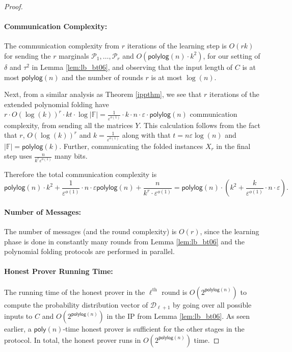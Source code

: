 \documentclass[11pt]{article}
\newcommand{\poly}{\mathsf{poly}}
\newcommand{\polylog}{\mathsf{polylog}}
\newcommand{\F}{\mathbb{F}}
\newcommand{\sD}{\mathcal{D}}
\newcommand{\sP}{\mathcal{P}}
\begin{document}
\begin{proof}
\paragraph*{Communication Complexity:}
The communication complexity from $r$ iterations of the learning step is $O(rk)$ for sending the $r$ marginals $\sP_1, \dots, \sP_r$ and $O(\polylog (n)\cdot k^{2})$, for our setting of $\delta$ and $\tau^{2}$ in Lemma \ref{lem:lb_bt06}, and observing that the input length of $C$ is at most $\polylog(n)$ and the number of rounds $r$ is at most $\log (n)$. 

Next, from a similar analysis as Theorem \ref{ippthm}, we see that $r$ iterations of the extended polynomial folding have $r\cdot O(\log (k))^{r}\cdot kt\cdot \log\vert \F \vert=\frac{1}{\varepsilon^{o(1)}}\cdot k\cdot n\cdot \varepsilon\cdot \polylog(n)$ communication complexity, from sending all the matrices $Y$. This calculation follows from the fact that $r$, $O(\log (k))^{r}$ and $k=\frac{1}{\varepsilon^{o(1)}}$ along with that $t=n\varepsilon\log (n)$ and $|\F|=\polylog(k)$. Further, communicating the folded instances $X_r$ in the final step uses $\frac{n}{k^{r}\varepsilon^{o(1)}}$ many bits. 


Therefore the total communication complexity is
\begin{equation*}
    \polylog(n)\cdot k^{2}+\frac{1}{\varepsilon^{o(1)}}\cdot n\cdot \varepsilon\polylog(n) + \frac{n}{k^{r}\cdot \varepsilon^{o(1)}}=\polylog (n) \cdot \left(k^{2}+\frac{k}{\varepsilon^{o(1)}}\cdot n\cdot\varepsilon\right).
\end{equation*}

\paragraph*{Number of Messages:} The number of messages (and the round complexity) is $O(r)$, since the learning phase is done in constantly many rounds from Lemma \ref{lem:lb_bt06} and the polynomial folding protocols are performed in parallel.

\paragraph*{Honest Prover Running Time:} 
The running time of the honest prover in the $\ell^{\text{th}}$ round is $O \left( 2^{\polylog(n)} \right)$ to compute the probability distribution vector of $\sD_{\ell+1}$ by going over all possible inputs to $C$ and $O \left( 2^{\polylog(n)} \right)$ in the IP from Lemma \ref{lem:lb_bt06}. As seen earlier, a $\poly(n)$-time honest prover is sufficient for the other stages in the protocol. In total, the honest prover runs in $O \left( 2^{\polylog(n)} \right)$ time.


\end{proof}
\end{document}
